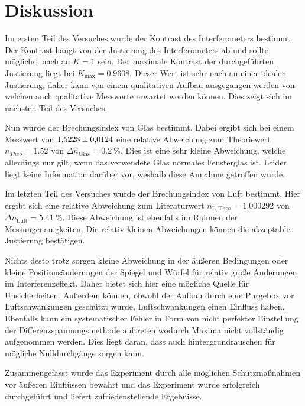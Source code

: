 \chapter{Diskussion}
\label{cha:Diskussion}
Im ersten Teil des Versuches wurde der Kontrast des Interferometers bestimmt. Der Kontrast hängt von der Justierung des Interferometers ab und sollte möglichst nach an $K = 1$ sein.
Der maximale Kontrast der durchgeführten Justierung liegt bei $K_\mathrm{max} = 0.9608$. Dieser Wert ist sehr nach an einer idealen Justierung, daher kann von einem qualitativen Aufbau
ausgegangen werden von welchen auch qualitative Messwerte erwartet werden können. Dies zeigt sich im nächsten Teil des Versuches. 

Nun wurde der Brechungsindex von Glas bestimmt. Dabei
ergibt sich bei einem Messwert von $\num{1.5228 \pm 0.0124}$ eine relative Abweichung zum Theoriewert $n_{Theo} = \num{1.52}$\cite{phy-chem-eigenschaften} von $\Delta n_\mathrm{Glas} = \qty{0.2}{\percent}$. Dies ist eine sehr kleine Abweichung, 
welche allerdings nur gilt, wenn das verwendete Glas normales Fensterglas ist. Leider liegt keine Information darüber vor, weshalb diese Annahme getroffen wurde.

Im letzten Teil des Versuches wurde der Brechungsindex von Luft bestimmt. Hier ergibt sich eine relative Abweichung zum Literaturwert $n_{\mathrm{L,Theo}} = 1.000292$ \cite{Ingenieurwissen} von $\Delta n_\mathrm{Luft} = \qty{5.41}{\percent}$.
Diese Abweichung ist ebenfalls im Rahmen der Messungenauigkeiten. Die relativ kleinen Abweichungen können die akzeptable Justierung bestätigen. 

Nichts desto trotz sorgen kleine Abweichung in der äußeren Bedingungen oder kleine Positionsänderungen der Spiegel und Würfel für relativ große Änderungen im Interferenzeffekt. Daher 
bietet sich hier eine mögliche Quelle für Unsicherheiten. Außerdem können, obwohl der Aufbau durch eine Purgebox vor Luftschwankungen geschützt wurde, Luftschwankungen einen Einfluss haben.
Ebenfalls kann ein systematischer Fehler in Form von nicht perfekter Einstellung der Differenzspannungsmethode auftreten wodurch Maxima nicht vollständig aufgenommen werden. Dies liegt 
daran, dass auch hintergrundrauschen für mögliche Nulldurchgänge sorgen kann.

Zusammengefasst wurde das Experiment durch alle möglichen Schutzmaßnahmen vor äußeren Einflüssen bewahrt und das Experiment wurde erfolgreich durchgeführt und liefert zufriedenstellende Ergebnisse. 

